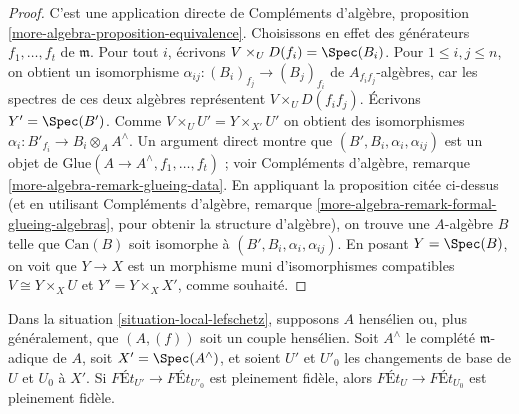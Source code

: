 \begin{proof}
C'est une application directe de
Compléments d'algèbre, proposition \ref{more-algebra-proposition-equivalence}.
Choisissons en effet des générateurs $f_1, \ldots, f_t$ de $\mathfrak m$.
Pour tout $i$, écrivons $V \times_U D(f_i) = \Spec(B_i)$.
Pour $1 \leq i, j \leq n$, on obtient un isomorphisme
$\alpha_{ij} : (B_i)_{f_j} \to (B_j)_{f_i}$ de $A_{f_if_j}$-algèbres,
car les spectres de ces deux algèbres représentent $V \times_U D(f_if_j)$.
Écrivons $Y' = \Spec(B')$. Comme $V \times_U U' = Y \times_{X'} U'$
on obtient des isomorphismes $\alpha_i : B'_{f_i} \to B_i \otimes_A A^\wedge$.
Un argument direct montre que $(B', B_i, \alpha_i, \alpha_{ij})$
est un objet de $\text{Glue}(A \to A^\wedge, f_1, \ldots, f_t)$ ; voir
Compléments d'algèbre, remarque \ref{more-algebra-remark-glueing-data}.
En appliquant la proposition citée ci-dessus (et en utilisant
Compléments d'algèbre, remarque \ref{more-algebra-remark-formal-glueing-algebras},
pour obtenir la structure d'algèbre), on trouve une $A$-algèbre $B$ telle que
$\text{Can}(B)$ soit isomorphe à $(B', B_i, \alpha_i, \alpha_{ij})$.
En posant $Y = \Spec(B)$, on voit que $Y \to X$ est un morphisme
muni d'isomorphismes compatibles
$V \cong Y \times_X U$ et $Y' = Y \times_X X'$, comme souhaité.
\end{proof}

\begin{lemma}
\label{lemma-fully-faithful-henselian-completion}
Dans la situation \ref{situation-local-lefschetz}, supposons $A$ hensélien
ou, plus généralement, que $(A, (f))$ soit un couple hensélien.
Soit $A^\wedge$ le complété $\mathfrak m$-adique de $A$,
soit $X' = \Spec(A^\wedge)$, et soient $U'$ et $U'_0$ les changements de base de
$U$ et $U_0$ à $X'$. Si $\textit{F\'Et}_{U'} \to \textit{F\'Et}_{U'_0}$
est pleinement fidèle, alors $\textit{F\'Et}_U \to \textit{F\'Et}_{U_0}$
est pleinement fidèle.
\end{lemma}

